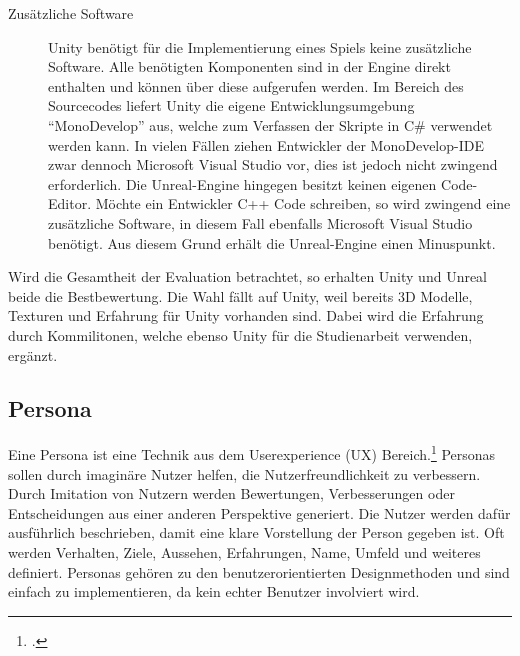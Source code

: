 \begin{description}
		\item[Zusätzliche Software]{Unity benötigt für die Implementierung eines Spiels keine zusätzliche Software. Alle benötigten Komponenten sind in der Engine direkt enthalten und können über diese aufgerufen werden. Im Bereich des Sourcecodes liefert Unity die eigene Entwicklungsumgebung \enquote{MonoDevelop} aus, welche zum Verfassen der Skripte in C\# verwendet werden kann. In vielen Fällen ziehen Entwickler der MonoDevelop-IDE zwar dennoch Microsoft Visual Studio vor, dies ist jedoch nicht zwingend erforderlich. Die Unreal-Engine hingegen besitzt keinen eigenen Code-Editor. Möchte ein Entwickler C++ Code schreiben, so wird zwingend eine zusätzliche Software, in diesem Fall ebenfalls Microsoft Visual Studio benötigt. Aus diesem Grund erhält die Unreal-Engine einen Minuspunkt.}
	\end{description}
	Wird die Gesamtheit der Evaluation betrachtet, so erhalten Unity und Unreal beide die Bestbewertung. Die Wahl fällt auf Unity, weil bereits 3D Modelle, Texturen und Erfahrung für Unity vorhanden sind. Dabei wird die Erfahrung durch Kommilitonen, welche ebenso Unity für die Studienarbeit verwenden, ergänzt.

\subsection{Persona}\label{ssec:persona}
	Eine Persona ist eine Technik aus dem Userexperience (UX) Bereich.\footcite{persona} Personas sollen durch imaginäre Nutzer helfen, die Nutzerfreundlichkeit zu verbessern. Durch Imitation von Nutzern werden Bewertungen, Verbesserungen oder Entscheidungen aus einer anderen Perspektive generiert. Die Nutzer werden dafür ausführlich beschrieben, damit eine klare Vorstellung der Person gegeben ist. Oft werden Verhalten, Ziele, Aussehen, Erfahrungen, Name, Umfeld und weiteres definiert.
	Personas gehören zu den benutzerorientierten Designmethoden und sind einfach zu implementieren, da kein echter Benutzer involviert wird.
